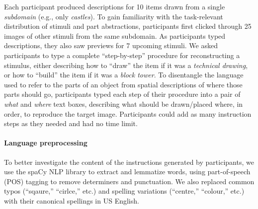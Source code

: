 \documentclass[10pt,letterpaper]{article}
\begin{document}
Each participant produced descriptions for 10 items drawn from a single \textit{subdomain} (e.g., only \textit{castles}). 
To gain familiarity with the task-relevant distribution of stimuli and part abstractions, participants first clicked through 25 images of other stimuli from the same subdomain.
As participants typed descriptions, they also saw previews for 7 upcoming stimuli.
We asked participants to type a complete ``step-by-step'' procedure for reconstructing a stimulus, either describing how to ``draw'' the item if it was a \textit{technical drawing}, or how to ``build'' the item if it was a \textit{block tower}.
To disentangle the language used to refer to the parts of an object from spatial descriptions of where those parts should go, participants typed each step of their procedure into a pair of \textit{what} and \textit{where} text boxes, describing what should be drawn/placed where, in order, to reproduce the target image. 
Participants could add as many instruction steps as they needed and had no time limit.

\paragraph{Language preprocessing} %
To better investigate the content of the instructions generated by participants, we use the spaCy NLP library to extract and lemmatize words, using part-of-speech (POS) tagging to remove determiners and punctuation. We also replaced common typos (``sqaure,'' ``cirlce,'' etc.) and spelling variations (``centre,'' ``colour,'' etc.) with their canonical spellings in US English.
\end{document}
